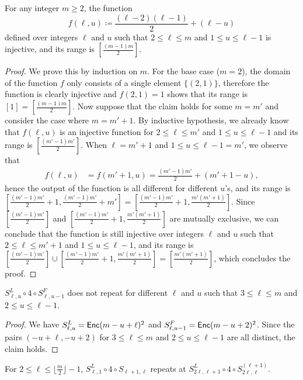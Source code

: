 \begin{reminderclaim}{}
For any integer $m\geq 2$, the function
\[f(\ell,u)\coloneqq\frac{(\ell-2)(\ell-1)}{2}+(\ell-u)\]
defined over integers $\ell$ and $u$ such that $2\leq \ell\leq m$ and $1\leq u\leq \ell-1$ is injective, and its range is $[\frac{(m-1)m}{2}]$.
\end{reminderclaim}

\begin{proof}
We prove this by induction on $m$. For the base case ($m=2$), the domain of the function $f$ only consists of a single element $\{(2,1)\}$, therefore the function is clearly injective and $f(2,1)=1$ shows that its range is $[1]=[\frac{(m-1)m}{2}]$. Now suppose that the claim holds for some $m=m'$ and consider the case where $m=m'+1$. By inductive hypothesis, we already know that $f(\ell,u)$ is an injective function for $2\leq\ell\leq m'$ and $1\leq u\leq \ell-1$ and its range is $[\frac{(m'-1)m'}{2}]$. When $\ell=m'+1$ and $1\leq u\leq \ell-1=m'$, we observe that
\begin{align*}
    f(\ell,u) &= f(m'+1,u) = \frac{(m'-1)m'}{2} + (m'+1-u),
\end{align*}
hence the output of the function is all different for different $u$'s, and its range is $[\frac{(m'-1)m'}{2}+1,\frac{(m'-1)m'}{2}+m']=[\frac{(m'-1)m'}{2}+1,\frac{m'(m'+1)}{2}]$. Since $[\frac{(m'-1)m'}{2}]$ and $[\frac{(m'-1)m'}{2}+1,\frac{m'(m'+1)}{2}]$ are mutually exclusive, we can conclude that the function is still injective over integers $\ell$ and $u$ such that $2\leq \ell\leq m'+1$ and $1\leq u\leq \ell-1$, and its range is $[\frac{(m'-1)m'}{2}]\cup[\frac{(m'-1)m'}{2}+1,\frac{m'(m'+1)}{2}] = [\frac{m'(m'+1)}{2}]$, which concludes the proof.
\end{proof}

\begin{reminderclaim}{}
$S_{\ell,u}^L\circ4\circ S_{\ell,u-1}^F$ does not repeat for different $\ell$ and $u$ such that $3\leq\ell\leq m$ and $2\leq u\leq\ell-1$.
\end{reminderclaim}

\begin{proof}
We have $S_{\ell,u}^L=\mathsf{Enc}(m-u+\ell)^2$ and $S_{\ell,u-1}^F=\mathsf{Enc}(m-u+2)^2$. Since the pairs $(-u+\ell,-u+2)$ for $3\leq\ell\leq m$ and $2\leq u\leq\ell-1$ are all distinct, the claim holds.
\end{proof}

\begin{reminderclaim}{}
For $2\leq\ell\leq\lfloor\frac{m}{2}\rfloor-1$, $S_{\ell,1}^L\circ4\circ S_{\ell+1,\ell}$ repeats at $S_{2\ell,\ell+1}^L\circ4\circ S_{2\ell,\ell}^{(\ell+1)}$.
\end{reminderclaim}

